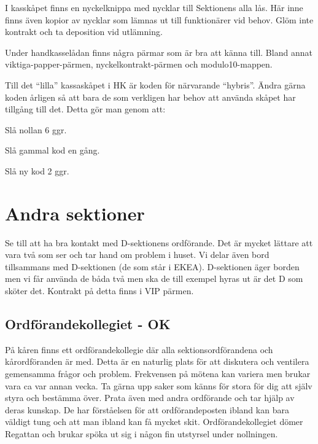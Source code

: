 \documentclass[10pt]{article}
\begin{document}
    I kasskåpet finns en nyckelknippa med nycklar till Sektionens alla lås. Här inne finns även kopior av nycklar som lämnas ut till funktionärer vid behov. Glöm inte kontrakt och ta deposition vid utlämning.
    
    Under handkasselådan finns några pärmar som är bra att känna till. Bland annat viktiga-papper-pärmen, nyckelkontrakt-pärmen och modulo10-mappen.
    
    Till det ``lilla'' kassaskåpet i HK är koden för närvarande ``hybris''. Ändra gärna koden årligen så att bara de som verkligen har behov att använda skåpet har tillgång till det. Detta gör man genom att:
    
    \begin{numplist}
    \item Slå nollan 6 ggr.
    \item Slå gammal kod en gång.
    \item Slå ny kod 2 ggr.
    \end{numplist}

    \section{Andra sektioner}
    
    Se till att ha bra kontakt med D-sektionens ordförande. Det är mycket lättare att vara två som ser och tar hand om problem i huset. Vi delar även bord tillsammans med D-sektionen (de som står i EKEA). D-sektionen äger borden men vi får använda de båda två men ska de till exempel hyras ut är det D som sköter det. Kontrakt på detta finns i VIP pärmen.
    
    \subsection{Ordförandekollegiet - OK}
    
    På kåren finns ett ordförandekollegie där alla sektionsordförandena och kårordföranden är med. Detta är en naturlig plats för att diskutera och ventilera gemensamma frågor och problem. Frekvensen på mötena kan variera men brukar vara ca var annan vecka. Ta gärna upp saker som känns för stora för dig att själv styra och bestämma över. Prata även med andra ordförande och tar hjälp av deras kunskap. De har förståelsen för att ordförandeposten ibland kan bara väldigt tung och att man ibland kan få mycket skit.
    Ordförandekollegiet dömer Regattan och brukar spöka ut sig i någon fin utstyrsel under nollningen.
\end{document}
